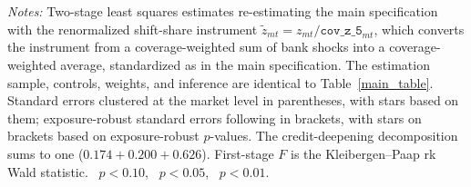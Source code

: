 \begin{threeparttable}
\begin{tablenotes}[flushleft]
        \item \textit{Notes:} Two-stage least squares estimates re-estimating the main specification with the renormalized shift-share instrument $\tilde z_{mt} = z_{mt} / \texttt{cov\_z\_5}_{mt}$, which converts the instrument from a coverage-weighted sum of bank shocks into a coverage-weighted average, standardized as in the main specification. The estimation sample, controls, weights, and inference are identical to Table~\ref{main_table}. Standard errors clustered at the market level in parentheses, with stars based on them; exposure-robust standard errors following \citet{adao2019shiftshare} in brackets, with stars on brackets based on exposure-robust $p$-values. The credit-deepening decomposition sums to one ($0.174+0.200+0.626$). First-stage $F$ is the Kleibergen--Paap rk Wald statistic. \sym{*}~$p<0.10$, \sym{**}~$p<0.05$, \sym{***}~$p<0.01$.
    \end{tablenotes}
\end{threeparttable}
